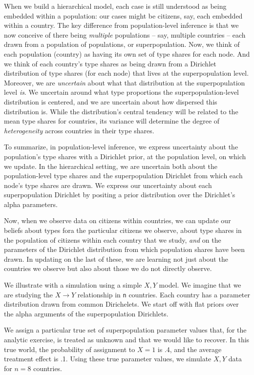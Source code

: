 \documentclass[
  12pt,
]{book}
\begin{document}
When we build a hierarchical model, each case is still understood as being embedded within a population: our cases might be citizens, say, each embedded within a country. The key difference from population-level inference is that we now conceive of there being \emph{multiple} populations -- say, multiple countries -- each drawn from a population of populations, or superpopulation. Now, we think of each population (country) as having its own set of type shares for each node. And we think of each country's type shares as being drawn from a Dirichlet distribution of type shares (for each node) that lives at the superpopulation level. Moreover, we are \emph{uncertain} about what that distribution at the superpopulation level \emph{is}. We uncertain around what type proportions the superpopulation-level distribution is centered, and we are uncertain about how dispersed this distribution is. While the distribution's central tendency will be related to the mean type shares for countries, its variance will determine the degree of \emph{heterogeneity} across countries in their type shares.

To summarize, in population-level inference, we express uncertainty about the population's type shares with a Dirichlet prior, at the population level, on which we update. In the hierarchical setting, we are uncertain both about the population-level type shares and the superpopulation Dirichlet from which each node's type shares are drawn. We express our uncertainty about each superpopulation Dirichlet by positing a prior distribution over the Dirichlet's alpha parameters.

Now, when we observe data on citizens within countries, we can update our beliefs about types fora the particular citizens we observe, about type shares in the population of citizens within each country that we study, \emph{and} on the parameters of the Dirichlet distribution from which population shares have been drawn. In updating on the last of these, we are learning not just about the countries we observe but also about those we do not directly observe.

We illustrate with a simulation using a simple \(X,Y\) model. We imagine that we are studying the \(X \rightarrow Y\) relationship in \texttt{n} countries. Each country has a parameter distribution drawn from common Dirichelets. We start off with flat priors over the alpha arguments of the superpopulation Dirichlets.

We assign a particular true set of superpopulation parameter values that, for the analytic exercise, is treated as unknown and that we would like to recover. In this true world, the probability of assignment to \(X=1\) is .4, and the average treatment effect is .1. Using these true parameter values, we simulate \(X, Y\) data for \(n=8\) countries.
\end{document}
